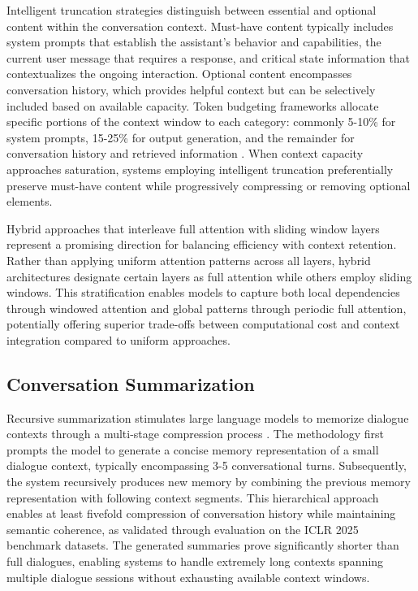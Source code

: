 Intelligent truncation strategies distinguish between essential and optional content within the conversation context. Must-have content typically includes system prompts that establish the assistant's behavior and capabilities, the current user message that requires a response, and critical state information that contextualizes the ongoing interaction. Optional content encompasses conversation history, which provides helpful context but can be selectively included based on available capacity. Token budgeting frameworks allocate specific portions of the context window to each category: commonly 5-10\% for system prompts, 15-25\% for output generation, and the remainder for conversation history and retrieved information \citep{alsalboukh2024strategies}. When context capacity approaches saturation, systems employing intelligent truncation preferentially preserve must-have content while progressively compressing or removing optional elements.

Hybrid approaches that interleave full attention with sliding window layers represent a promising direction for balancing efficiency with context retention. Rather than applying uniform attention patterns across all layers, hybrid architectures designate certain layers as full attention while others employ sliding windows. This stratification enables models to capture both local dependencies through windowed attention and global patterns through periodic full attention, potentially offering superior trade-offs between computational cost and context integration compared to uniform approaches.

\subsection{Conversation Summarization}

Recursive summarization stimulates large language models to memorize dialogue contexts through a multi-stage compression process \citep{wu2023recursively}. The methodology first prompts the model to generate a concise memory representation of a small dialogue context, typically encompassing 3-5 conversational turns. Subsequently, the system recursively produces new memory by combining the previous memory representation with following context segments. This hierarchical approach enables at least fivefold compression of conversation history while maintaining semantic coherence, as validated through evaluation on the ICLR 2025 benchmark datasets. The generated summaries prove significantly shorter than full dialogues, enabling systems to handle extremely long contexts spanning multiple dialogue sessions without exhausting available context windows.

